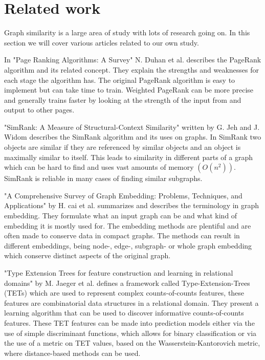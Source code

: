 \section{Related work}
\label{sec:Related_work}
Graph similarity is a large area of study with lots of research going on. In this section we will cover various articles related to our own study.

In "Page Ranking Algorithms: A Survey" N. Duhan et al.\cite{4809246} describes the PageRank algorithm and its related concept. They explain the strengths and weaknesses for each stage the algorithm has. The original PageRank algorithm is easy to implement but can take time to train. Weighted PageRank can be more precise and generally trains faster by looking at the strength of the input from and output to other pages. 

"SimRank: A Measure of Structural-Context Similarity" written by G. Jeh and J. Widom\cite{10.1145/775047.775126} describes the SimRank algorithm and its uses on graphs. In SimRank two objects are similar if they are referenced by similar objects and an object is maximally similar to itself. This leads to similarity in different parts of a graph which can be hard to find and uses vast amounts of memory $(O(n^2))$. SimRank is reliable in many cases of finding similar subgraphs.

"A Comprehensive Survey of Graph Embedding: Problems, Techniques, and Applications" by H. cai et al.\cite{8294302} summarizes and describes the terminology in graph embedding. They formulate what an input graph can be and what kind of embedding it is mostly used for. The embedding methods are plentiful and are often made to conserve data in compact graphs. The methods can result in different embeddings, being node-, edge-, subgraph- or whole graph embedding which conserve distinct aspects of the original graph.

"Type Extension Trees for feature construction and learning in relational domains" by M. Jaeger et al. \cite{JAEGER201330} defines a framework called Type-Extension-Trees (TETs) which are used to represent complex counts-of-counts features, these features are combinatorial data structures in a relational domain. They present a learning algorithm that can be used to discover informative counts-of-counts features. These TET features can be made into prediction models either via the use of simple discriminant functions, which allows for binary classification or via the use of a metric on TET values, based on the Wasserstein-Kantorovich metric, where distance-based methods can be used.

